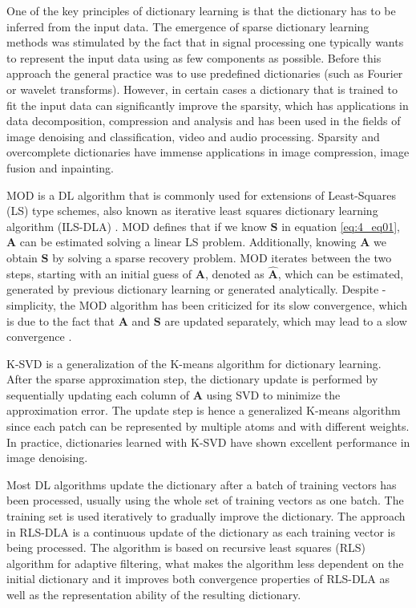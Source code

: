 One of the key principles of dictionary learning is that the dictionary has to be inferred from the input data. The emergence of sparse dictionary learning methods was stimulated by the fact that in signal processing one typically wants to represent the input data using as few components as possible. Before this approach the general practice was to use predefined dictionaries (such as Fourier or wavelet transforms). However, in certain cases a dictionary that is trained to fit the input data can significantly improve the sparsity, which has applications in data decomposition, compression and analysis and has been used in the fields of image denoising and classification, video and audio processing. Sparsity and overcomplete dictionaries have immense applications in image compression, image fusion and inpainting.

MOD \cite{engan1999method} is a DL algorithm that is commonly used for extensions of Least-Squares (LS) type schemes, also known as iterative least squares dictionary learning algorithm (ILS-DLA) \cite{engan2007family}. MOD defines that if we know $\boldsymbol{S}$ in equation \ref{eq:4_eq01}, $\boldsymbol{A}$ can be estimated solving a linear LS problem. Additionally, knowing $\boldsymbol{A}$ we obtain $\boldsymbol{S}$ by solving a sparse recovery problem. MOD iterates between the two steps, starting with an initial guess of $\boldsymbol{A}$, denoted as $\hat{\boldsymbol{A}}$, which can be estimated, generated by previous dictionary learning or generated analytically. Despite - simplicity, the MOD algorithm has been criticized for its slow convergence, which is due to the fact that $\boldsymbol{A}$ and $\boldsymbol{S}$ are updated separately, which may lead to a slow convergence \cite{aharon2006rm}.

K-SVD \cite{aharon2006rm} is a generalization of the K-means algorithm for dictionary learning. After the sparse approximation step, the dictionary update is performed by sequentially updating each column of $\boldsymbol{A}$ using SVD to minimize the approximation error. The update step is hence a generalized K-means algorithm since each patch can be represented by multiple atoms and with different weights. In practice, dictionaries learned with K-SVD
have shown excellent performance in image denoising. 

Most DL algorithms update the dictionary after a batch of training vectors has been processed, usually using the whole set of training vectors as one batch. The training set is used iteratively to gradually improve the dictionary. The approach in RLS-DLA \cite{skretting2010recursive} is a continuous update of the dictionary as each training vector is being processed. The algorithm is based on recursive least squares (RLS) algorithm for adaptive filtering, what makes the algorithm less dependent on the initial dictionary and it improves both convergence properties of RLS-DLA as well as the representation ability of the resulting dictionary. 


